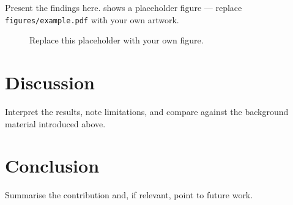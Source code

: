 \documentclass[9pt,a4paper,twocolumn,twoside]{rho-class/rho}
\begin{document}
Present the findings here.  shows a placeholder figure —
replace \texttt{figures/example.pdf} with your own artwork.

\begin{figure}[htbp]
    \centering
    \fbox{\rule{0pt}{3cm}\rule{0.7\linewidth}{0pt}}
    \caption{Replace this placeholder with your own figure.}
    \label{fig:example}
\end{figure}

\section{Discussion}

Interpret the results, note limitations, and compare against the background
material introduced above.

\section{Conclusion}

Summarise the contribution and, if relevant, point to future work.


\printbibliography
\end{document}
